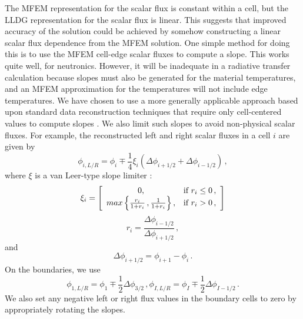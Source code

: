 The MFEM representation for the scalar flux is constant within a cell, but the LLDG representation for the scalar flux is linear.  This suggests that improved 
accuracy of the \SN solution could be achieved by somehow constructing a linear scalar flux dependence from the MFEM solution.  One simple method for doing 
this is to use the MFEM cell-edge scalar fluxes to compute a slope.  This works quite well, for neutronics.  However, it will be inadequate in a radiative 
transfer calculation because slopes must also be generated for the material temperatures, and an MFEM approximation for the temperatures will not include 
edge temperatures.  We have chosen to use a more generally applicable approach based upon standard data reconstruction techniques 
that require only cell-centered values to compute slopes \cite{vanLeer}.  We also limit such slopes to avoid non-physical scalar fluxes.  For example, the reconstructed left and right scalar fluxes in a cell $i$ are given by 
	\begin{equation} \label{consistent:reconstruction}
		\phi_{i,L/R} = \phi_i \mp \frac{1}{4} \xi_i \left(\Delta \phi_{i+1/2} + \Delta \phi_{i-1/2}\right) \,,
	\end{equation}
where $\xi$ is a van Leer-type slope limiter \cite{vanLeer}:
\begin{equation}
\xi_i = \left[ 
\begin{array} {cl}
0, & \mbox{if  $r_i \le 0$}\,,\\
max\left\{ \frac{r_i}{1+r_i}\,,\frac{1}{1+r_i} \right\}, & \mbox{if $r_i > 0$}\,,
\end{array}
 \right]
\end{equation}
\begin{equation}
r_i = \frac{\Delta \phi_{i-1/2}}{\Delta \phi_{i+1/2}} \, ,
\end{equation}
and
\begin{equation}
\Delta \phi_{i+1/2}=\phi_{i+1}-\phi_{i} \, .
\end{equation}
On the boundaries, we use 
	\begin{subequations}
		\begin{equation}
			\phi_{1,L/R} = \phi_1 \mp \frac{1}{2} \Delta \phi_{3/2} \,,
		\end{equation}
		\begin{equation}
			\phi_{I,L/R} = \phi_I \mp \frac{1}{2} \Delta \phi_{I-1/2} \,.
		\end{equation}
	\end{subequations}
We also set any negative left or right flux values in the boundary cells to zero by appropriately rotating the slopes.
